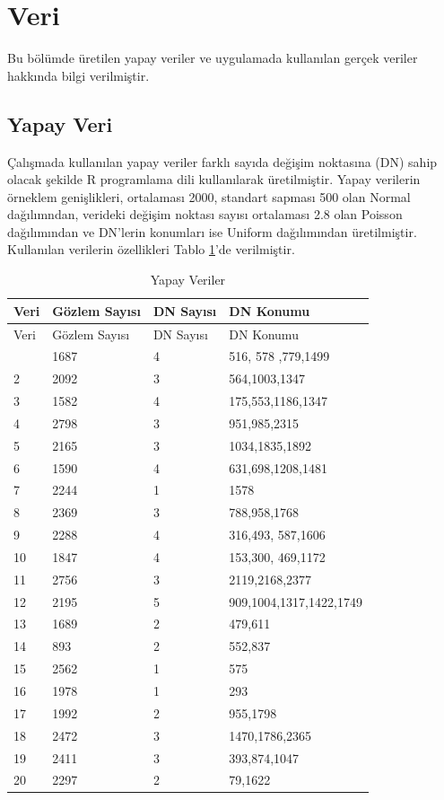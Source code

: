\documentclass[12pt,twoside]{deuthesis}
\begin{document}
\hypertarget{veri}{%
\section{Veri}\label{veri}}

Bu bölümde üretilen yapay veriler ve uygulamada kullanılan gerçek veriler hakkında bilgi verilmiştir.

\hypertarget{yapay-veri}{%
\subsection{Yapay Veri}\label{yapay-veri}}

Çalışmada kullanılan yapay veriler farklı sayıda değişim noktasına (DN) sahip olacak şekilde R programlama dili kullanılarak üretilmiştir. Yapay verilerin örneklem genişlikleri, ortalaması 2000, standart sapması 500 olan Normal dağılımndan, verideki değişim noktası sayısı ortalaması 2.8 olan Poisson dağılımından ve DN'lerin konumları ise Uniform dağılımından üretilmiştir. Kullanılan verilerin özellikleri Tablo \ref{tab:nvar1}'de verilmiştir.

\begin{longtable}[]{@{}llll@{}}
\caption{\label{tab:nvar1} Yapay Veriler}\tabularnewline
\toprule\noalign{}
Veri & Gözlem Sayısı & DN Sayısı & DN Konumu \\
\midrule\noalign{}
\endfirsthead
\toprule\noalign{}
Veri & Gözlem Sayısı & DN Sayısı & DN Konumu \\
\midrule\noalign{}
\endhead
\bottomrule\noalign{}
\endlastfoot
1 & 1687 & 4 & 516, 578 ,779,1499 \\
2 & 2092 & 3 & 564,1003,1347 \\
3 & 1582 & 4 & 175,553,1186,1347 \\
4 & 2798 & 3 & 951,985,2315 \\
5 & 2165 & 3 & 1034,1835,1892 \\
6 & 1590 & 4 & 631,698,1208,1481 \\
7 & 2244 & 1 & 1578 \\
8 & 2369 & 3 & 788,958,1768 \\
9 & 2288 & 4 & 316,493, 587,1606 \\
10 & 1847 & 4 & 153,300, 469,1172 \\
11 & 2756 & 3 & 2119,2168,2377 \\
12 & 2195 & 5 & 909,1004,1317,1422,1749 \\
13 & 1689 & 2 & 479,611 \\
14 & 893 & 2 & 552,837 \\
15 & 2562 & 1 & 575 \\
16 & 1978 & 1 & 293 \\
17 & 1992 & 2 & 955,1798 \\
18 & 2472 & 3 & 1470,1786,2365 \\
19 & 2411 & 3 & 393,874,1047 \\
20 & 2297 & 2 & 79,1622 \\
\end{longtable}
\end{document}
